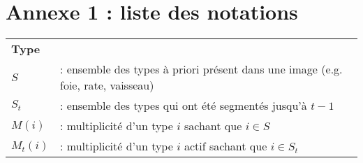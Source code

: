 

\section*{Annexe 1 : liste des notations}
\label{appendix:a}


	\begin{center}
	\begin{tabular}{ l l }	%
\textbf{Type} \\
	$S$		& : ensemble des types à priori présent dans une image (e.g. foie, rate, vaisseau) \\
	$S_t$ 		& : ensemble des types qui ont été segmentés jusqu'à $t-1$ \\
	$M(i)$		& : multiplicité d'un type $i$ sachant que $i \in S$\\
	$M_t(i)$	& : multiplicité d'un type $i$ actif sachant que $i \in S_t$\\


\end{tabular}
\end{center}
